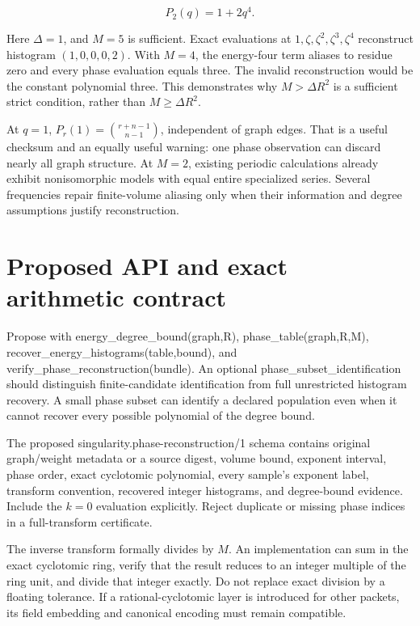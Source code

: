 \documentclass[
  11pt,
  a4paper,
]{report}
\let\nxtexttt\texttt
\renewcommand{\texttt}[1]{\nxtexttt{\seqsplit{#1}}}
\begin{document}
\[
P_2(q)=1+2q^4.
\]

Here \(\Delta=1\), and \(M=5\) is sufficient. Exact evaluations at
\(1,\zeta,\zeta^2,\zeta^3,\zeta^4\) reconstruct histogram
\((1,0,0,0,2)\). With \(M=4\), the energy-four term aliases to residue
zero and every phase evaluation equals three. The invalid reconstruction
would be the constant polynomial three. This demonstrates why
\(M>\Delta R^2\) is a sufficient strict condition, rather than
\(M\ge\Delta R^2\).

At \(q=1\), \(P_r(1)=\binom{r+n-1}{n-1}\), independent of graph edges.
That is a useful checksum and an equally useful warning: one phase
observation can discard nearly all graph structure. At \(M=2\), existing
periodic calculations already exhibit nonisomorphic models with equal
entire specialized series. Several frequencies repair finite-volume
aliasing only when their information and degree assumptions justify
reconstruction.

\hypertarget{proposed-api-and-exact-arithmetic-contract}{%
\section{Proposed API and exact arithmetic
contract}\label{proposed-api-and-exact-arithmetic-contract}}

Propose \texttt{src/singularity/phase\_probes.py} with
energy\_degree\_bound(graph,R), phase\_table(graph,R,M),
recover\_energy\_histograms(table,bound), and
verify\_phase\_reconstruction(bundle). An optional
phase\_subset\_identification should distinguish finite-candidate
identification from full unrestricted histogram recovery. A small phase
subset can identify a declared population even when it cannot recover
every possible polynomial of the degree bound.

The proposed singularity.phase-reconstruction/1 schema contains original
graph/weight metadata or a source digest, volume bound, exponent
interval, phase order, exact cyclotomic polynomial, every sample's
exponent label, transform convention, recovered integer histograms, and
degree-bound evidence. Include the \(k=0\) evaluation explicitly. Reject
duplicate or missing phase indices in a full-transform certificate.

The inverse transform formally divides by \(M\). An implementation can
sum in the exact cyclotomic ring, verify that the result reduces to an
integer multiple of the ring unit, and divide that integer exactly. Do
not replace exact division by a floating tolerance. If a
rational-cyclotomic layer is introduced for other packets, its field
embedding and canonical encoding must remain compatible.
\end{document}
